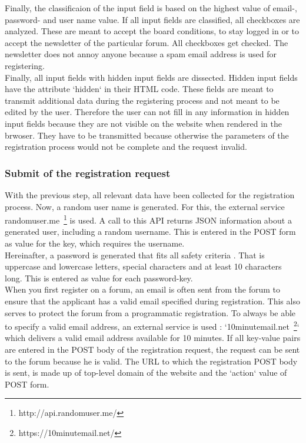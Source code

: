 Finally, the classificaion of the input field is based on the highest value of email-, password- and user name value. If all input fields are classified, all checkboxes are analyzed. These are meant to accept the board conditions, to stay logged in or to accept the newsletter of the particular forum. All checkboxes get checked. The newsletter does not annoy anyone because a spam email address is used for registering. \\
Finally, all input fields with hidden input fields are dissected. Hidden input fields have the attribute `hidden` in their HTML code.
These fields are meant to transmit additional data during the registering process and not meant to be edited by the user. Therefore the user can not fill in any information in hidden input fields because they are not visible on the website when rendered in the brwoser. They have to be transmitted because otherwise the parameters of the registration process would not be complete and the request invalid.

\subsubsection{Submit of the registration request}
With the previous step, all relevant data have been collected for the registration process. Now, a random user name is generated. For this, the external service randomuser.me~\footnote{http://api.randomuser.me/} is used.
A call to this API returns JSON information about a generated user, including a random username. This is entered in the POST form as value for the key, which requires the username. \\
Hereinafter, a password is generated that fits all safety criteria . That is uppercase and lowercase letters, special characters and at least 10 characters long. This is entered as value for each password-key.\\
When you first register on a forum, an email is often sent from the forum to ensure that the applicant has a valid email specified during registration. This also serves to protect the forum from a programmatic registration.
To always be able to specify a valid email address, an external service is used : `10minutemail.net~\footnote{https://10minutemail.net/}` which delivers a valid email address available for 10 minutes. If all key-value pairs are entered in the POST body of the registration request, the request can be sent to the forum because he is valid.
The URL to which the registration POST body is sent, is made up of top-level domain of the website and the `action` value of POST form.

